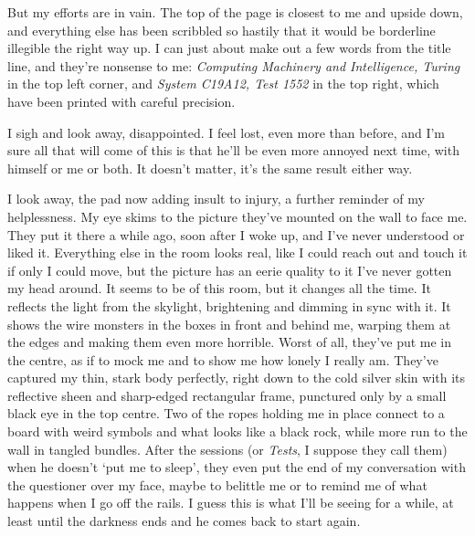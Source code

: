 But my efforts are in vain. The top of the page is closest to me and
upside down, and everything else has been scribbled so hastily that it
would be borderline illegible the right way up. I can just about make
out a few words from the title line, and they're nonsense to
me: \textit{Computing Machinery and Intelligence, Turing} in the top
left corner, and \textit{System C19A12, Test 1552} in the top right,
which have been printed with careful precision.

I sigh and look away, disappointed. I feel lost, even more than
before, and I'm sure all that will come of this is that he'll be even
more annoyed next time, with himself or me or both. It doesn't matter,
it's the same result either way.

I look away, the pad now adding insult to injury, a further reminder
of my helplessness. My eye skims to the picture they've mounted on the
wall to face me. They put it there a while ago, soon after I woke up,
and I've never understood or liked it. Everything else in the room
looks real, like I could reach out and touch it if only I could move,
but the picture has an eerie quality to it I've never gotten my head
around. It seems to be of this room, but it changes all the time. It
reflects the light from the skylight, brightening and dimming in sync
with it. It shows the wire monsters in the boxes in front and behind
me, warping them at the edges and making them even more
horrible. Worst of all, they've put me in the centre, as if to mock me
and to show me how lonely I really am. They've captured my thin, stark
body perfectly, right down to the cold silver skin with its reflective
sheen and sharp-edged rectangular frame, punctured only by a small
black eye in the top centre. Two of the ropes holding me in place
connect to a board with weird symbols and what looks like a black
rock, while more run to the wall in tangled bundles. After the
sessions (or \textit{Tests}, I suppose they call them) when he doesn't
`put me to sleep', they even put the end of my conversation with the
questioner over my face, maybe to belittle me or to remind me of what
happens when I go off the rails. I guess this is what I'll be seeing
for a while, at least until the darkness ends and he comes back to
start again.

